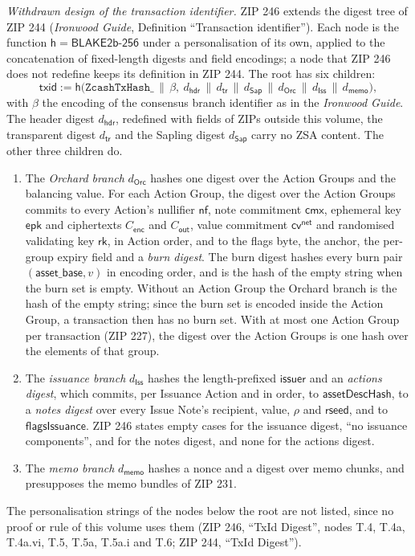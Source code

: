 \documentclass[11pt,a4paper]{article}
\theoremstyle{definition}
\newcommand{\nfsym}{\mathsf{nf}}
\newcommand{\cmx}{\mathsf{cmx}}
\newcommand{\cvsym}{\mathsf{cv}}
\newcommand{\rk}{\mathsf{rk}}
\begin{document}
\emph{Withdrawn design of the transaction identifier.} ZIP 246 extends the
digest tree of ZIP 244 (\emph{Ironwood Guide}, Definition ``Transaction
identifier''). Each node is the function $\mathsf{h} =
\mathsf{BLAKE2b\text{-}256}$ under a personalisation of its own, applied
to the concatenation of fixed-length digests and field encodings; a node
that ZIP 246 does not redefine keeps its definition in ZIP 244. The root
has six children:
\[
  \mathsf{txid} := \mathsf{h}\bigl(\texttt{ZcashTxHash\_} \,\|\, \beta,\
    d_{\mathsf{hdr}} \,\|\, d_{\mathsf{tr}} \,\|\, d_{\mathsf{Sap}}
    \,\|\, d_{\mathsf{Orc}} \,\|\, d_{\mathsf{Iss}} \,\|\,
    d_{\mathsf{memo}}\bigr),
\]
with $\beta$ the encoding of the consensus branch identifier as in the
\emph{Ironwood Guide}. The header digest $d_{\mathsf{hdr}}$, redefined with
fields of ZIPs outside this volume, the transparent digest $d_{\mathsf{tr}}$
and the Sapling digest $d_{\mathsf{Sap}}$ carry no ZSA content. The other
three children do.
\begin{enumerate}[label=(\alph*)]
\item The \emph{Orchard branch} $d_{\mathsf{Orc}}$ hashes one digest over
  the Action Groups and the balancing value. For each Action Group, the
  digest over the Action Groups commits to every Action's nullifier $\nfsym$,
  note commitment $\cmx$, ephemeral key $\mathsf{epk}$ and ciphertexts
  $C_{\mathsf{enc}}$ and $C_{\mathsf{out}}$, value commitment
  $\cvsym^{\mathsf{net}}$ and randomised validating key $\rk$, in Action
  order, and to the flags byte, the anchor, the per-group expiry field and a
  \emph{burn digest}. The burn digest hashes every burn pair
  $(\mathsf{asset\_base}, v)$ in encoding order, and is the hash of the
  empty string when the burn set is empty. Without an Action Group the
  Orchard branch is the hash of the empty string; since the burn set is
  encoded inside the Action Group, a transaction then has no burn set. With
  at most one Action Group per transaction (ZIP 227), the digest over the
  Action Groups is one hash over the elements of that group.
\item The \emph{issuance branch} $d_{\mathsf{Iss}}$ hashes the
  length-prefixed $\mathsf{issuer}$ and an \emph{actions digest}, which
  commits, per Issuance Action and in order, to $\mathsf{assetDescHash}$,
  to a \emph{notes digest} over every Issue Note's recipient, value, $\rho$
  and $\mathsf{rseed}$, and to $\mathsf{flagsIssuance}$. ZIP 246 states
  empty cases for the issuance digest, ``no issuance components'', and for
  the notes digest, and none for the actions digest.
\item The \emph{memo branch} $d_{\mathsf{memo}}$ hashes a nonce and a
  digest over memo chunks, and presupposes the memo bundles of ZIP 231.
\end{enumerate}
The personalisation strings of the nodes below the root are not listed,
since no proof or rule of this volume uses them (ZIP 246, ``TxId Digest'',
nodes T.4, T.4a, T.4a.vi, T.5, T.5a, T.5a.i and T.6; ZIP 244, ``TxId
Digest'').
\end{document}
